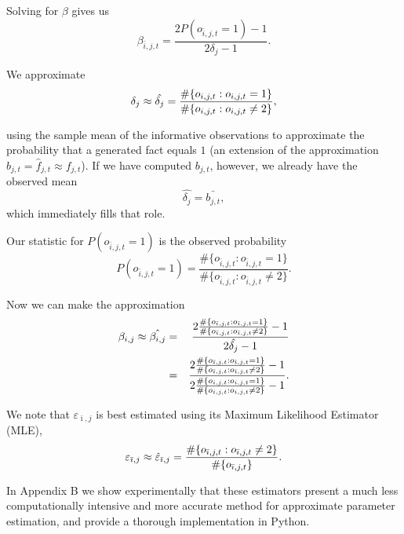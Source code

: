 \documentclass{amsart}
\theoremstyle{plain}
\numberwithin{equation}{section}
\begin{document}
Solving for $\beta$ gives us 
\begin{equation*}
\beta_{\bar{i},j,t} = \frac{2P(o_{\bar{i},j,t}=1) - 1}{2\delta_j - 1}.
\end{equation*}

We approximate 
\begin{equation*}
\delta _{j}\approx \hat{\delta _{j}}=\frac{\#\{o_{i,j,t}:o_{i,j,t}=1\}}{%
\#\{o_{i,j,t}:o_{i,j,t}\neq 2\}},
\end{equation*}

using the sample mean of the informative observations to approximate the
probability that a generated fact equals $1$ (an extension of the
approximation $b_{j,t}=\hat{f}_{j,t}\approx f_{j,t}$). If we have computed $%
b_{j,t}$, however, we already have the observed mean 
\begin{equation*}
\hat{\delta _{j}}=\bar{b_{j,t}},
\end{equation*}%
which immediately fills that role.

Our statistic for $P(o_{\bar{i},j,t}=1)$ is the observed probability 
\begin{equation*}
P(o_{\bar{i},j,t}=1) = \frac{ \# \{o_{\bar{i},j,t} : o_{\bar{i},j,t}=1\}}{
\# \{o_{\bar{i},j,t} : o_{\bar{i},j,t}\neq 2 \} }.
\end{equation*}

Now we can make the approximation%
\begin{eqnarray*}
\beta _{i,j}\approx \hat{\beta _{i,j}} &=&\frac{2\frac{\#\{o_{\bar{\imath}%
,j,t}:o_{\bar{\imath},j,t}=1\}}{\#\{o_{\bar{\imath},j,t}:o_{\bar{\imath}%
,j,t}\neq 2\}}-1}{2\hat{\delta _{j}}-1} \\
&=&\frac{2\frac{\#\{o_{\bar{\imath},j,t}:o_{\bar{\imath},j,t}=1\}}{\#\{o_{%
\bar{\imath},j,t}:o_{\bar{\imath},j,t}\neq 2\}}-1}{2\frac{%
\#\{o_{i,j,t}:o_{i,j,t}=1\}}{\#\{o_{i,j,t}:o_{i,j,t}\neq 2\}}-1}.
\end{eqnarray*}

We note that $\varepsilon _{\bar{\imath},j}$ is best estimated using its
Maximum Likelihood Estimator (MLE),%
\begin{equation*}
\varepsilon _{\bar{\imath},j}\approx \hat{\varepsilon}_{\bar{\imath},j}=%
\frac{\#\{o_{\bar{\imath},j,t}:o_{\bar{\imath},j,t}\neq 2\}}{\#\{o_{\bar{%
\imath},j,t}\}}.
\end{equation*}

In Appendix B we show experimentally that these estimators present a much
less computationally intensive and more accurate method for approximate
parameter estimation, and provide a thorough implementation in Python.
\end{document}
